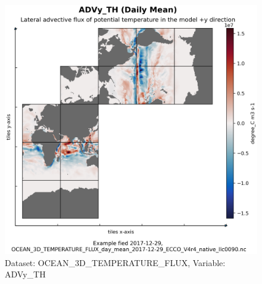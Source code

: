 \begin{figure}[H]
\centering
\includegraphics[scale=0.55]{../images/plots/native_plots/Ocean_Three-Dimensional_Potential_Temperature_Fluxes/ADVy_TH.png}
\caption{Dataset: OCEAN\_3D\_TEMPERATURE\_FLUX, Variable: ADVy\_TH}
\label{tab:table-OCEAN_3D_TEMPERATURE_FLUX_ADVy_TH-Plot}
\end{figure}
\pagebreak
